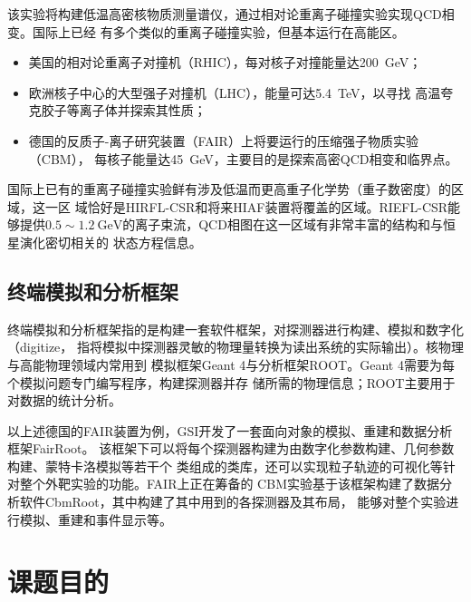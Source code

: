 \documentclass[bachelor,openany,oneside,color]{buaathesis}
\begin{document}
该实验将构建低温高密核物质测量谱仪，通过相对论重离子碰撞实验实现QCD相变。国际上已经
有多个类似的重离子碰撞实验，但基本运行在高能区。
\begin{itemize}
	\item 美国的相对论重离子对撞机（RHIC），每对核子对撞能量达\SI{200}{\giga\eV}；
	\item 欧洲核子中心的大型强子对撞机（LHC），能量可达\SI{5.4}{\tera\eV}，以寻找
		高温夸克胶子等离子体并探索其性质；
	\item 德国的反质子-离子研究装置（FAIR）上将要运行的压缩强子物质实验（CBM），
		每核子能量达\SI{45}{\giga\eV}，主要目的是探索高密QCD相变和临界点。
\end{itemize}
国际上已有的重离子碰撞实验鲜有涉及低温而更高重子化学势（重子数密度）的区域，这一区
域恰好是HIRFL-CSR和将来HIAF装置将覆盖的区域。RIEFL-CSR能够提供$0.5\sim\SI{1.2}
	{\giga\eV}$的离子束流，QCD相图在这一区域有非常丰富的结构和与恒星演化密切相关的
状态方程信息。

\subsection{终端模拟和分析框架}

终端模拟和分析框架指的是构建一套软件框架，对探测器进行构建、模拟和数字化（digitize，
指将模拟中探测器灵敏的物理量转换为读出系统的实际输出）。核物理与高能物理领域内常用到
模拟框架Geant 4与分析框架ROOT。Geant 4需要为每个模拟问题专门编写程序，构建探测器并存
储所需的物理信息；ROOT主要用于对数据的统计分析。

以上述德国的FAIR装置为例，GSI开发了一套面向对象的模拟、重建和数据分析框架FairRoot。
该框架下可以将每个探测器构建为由数字化参数构建、几何参数构建、蒙特卡洛模拟等若干个
类组成的类库，还可以实现粒子轨迹的可视化等针对整个外靶实验的功能。FAIR上正在筹备的
CBM实验基于该框架构建了数据分析软件CbmRoot，其中构建了其中用到的各探测器及其布局，
能够对整个实验进行模拟、重建和事件显示等。

\section{课题目的}
\end{document}
